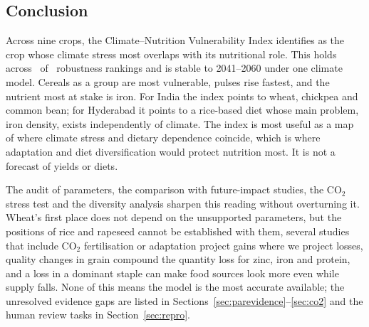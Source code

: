 \subsection{Conclusion}
Across nine crops, the Climate--Nutrition Vulnerability Index identifies \MakeLowercase{\topEq} as the crop whose
climate stress most overlaps with its nutritional role. This holds across \robTopFfour\ of \robNFfour\ robustness
rankings and is stable to 2041--2060 under one climate model. Cereals as a group are most vulnerable, pulses rise
fastest, and the nutrient most at stake is iron. For India the index points to wheat, chickpea and common bean; for
Hyderabad it points to a rice-based diet whose main problem, iron density, exists independently of climate. The
index is most useful as a map of where climate stress and dietary dependence coincide, which is where adaptation
and diet diversification would protect nutrition most. It is not a forecast of yields or diets.

The audit of parameters, the comparison with future-impact studies, the CO$_2$ stress test and the diversity analysis
sharpen this reading without overturning it. Wheat's first place does not depend on the unsupported parameters, but the
positions of rice and rapeseed cannot be established with them, several studies that include CO$_2$ fertilisation or
adaptation project gains where we project losses, quality changes in grain compound the quantity loss for zinc, iron
and protein, and a loss in a dominant staple can make food sources look more even while supply falls. None of this
means the model is the most accurate available; the unresolved evidence gaps are listed in
Sections~\ref{sec:parevidence}--\ref{sec:co2} and the human review tasks in Section~\ref{sec:repro}.
